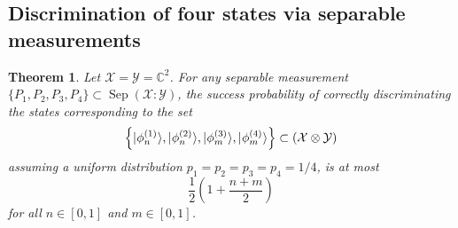 \documentclass[11pt]{article}
\newtheorem{theorem}{Theorem}
\theoremstyle{definition}
\newcommand{\microspace}{\mspace{0.5mu}}
\newcommand{\sep}{\operatorname{Sep}}
\newcommand{\ket}[1]{
  \lvert\microspace #1 \microspace \rangle}
\newcommand{\complex}{\mathbb{C}}
\newcommand{\X}{\mathcal{X}}
\newcommand{\Y}{\mathcal{Y}}
\begin{document}
\subsection*{Discrimination of four states via separable measurements}
\label{sec:discrim-four-states-sep-no-resource}

\begin{theorem}
    Let $\X = \Y = \complex^2$. For any separable measurement $\{ P_1, P_2,
    P_3, P_4 \} \subset \sep(\X : \Y)$, the success probability of correctly
    discriminating the states corresponding to the set 
	\begin{equation}
        \left\{ 
            \ket{\phi_n^{(1)}},
            \ket{\phi_n^{(2)}},
            \ket{\phi_m^{(3)}},
            \ket{\phi_m^{(4)}} 
        \right\} \subset 
        \left(\X \otimes \Y \right)
	\end{equation}
    assuming a uniform distribution $p_1 = p_2 = p_3 = p_4 = 1/4$, is at most
    \begin{equation}
        \frac{1}{2} \left(1 + \frac{n+m}{2}\right)
    \end{equation}
    for all $n \in [0, 1]$ and $m \in [0, 1]$.
\end{theorem}
\end{document}
